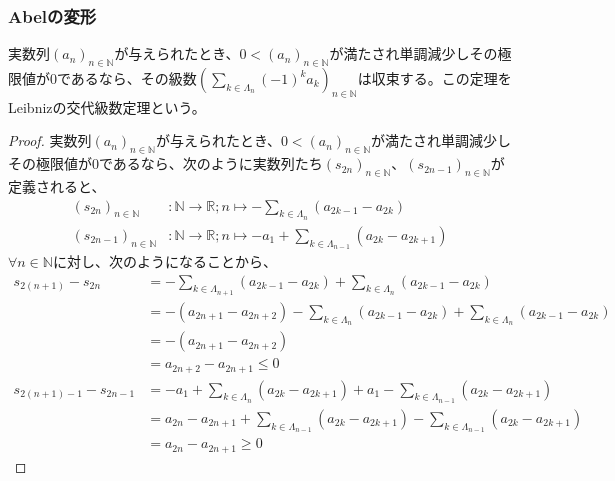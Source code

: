 \documentclass[dvipdfmx]{jsarticle}
\begin{document}
\subsubsection{Abelの変形}%
\begin{thm}[Leibnizの交代級数定理]\label{4.1.8.25}
実数列$\left( a_{n} \right)_{n \in \mathbb{N}}$が与えられたとき、$0 < \left( a_{n} \right)_{n \in \mathbb{N}}$が満たされ単調減少しその極限値が$0$であるなら、その級数$\left( \sum_{k \in \varLambda_{n}} {( - 1)^{k}a_{k}} \right)_{n \in \mathbb{N}}$は収束する。この定理をLeibnizの交代級数定理という。
\end{thm}
\begin{proof}
実数列$\left( a_{n} \right)_{n \in \mathbb{N}}$が与えられたとき、$0 < \left( a_{n} \right)_{n \in \mathbb{N}}$が満たされ単調減少しその極限値が$0$であるなら、次のように実数列たち$\left( s_{2n} \right)_{n \in \mathbb{N}}$、$\left( s_{2n - 1} \right)_{n \in \mathbb{N}}$が定義されると、
\begin{align*}
\left( s_{2n} \right)_{n \in \mathbb{N}}&:\mathbb{N} \rightarrow \mathbb{R};n \mapsto - \sum_{k \in \varLambda_{n}} \left( a_{2k - 1} - a_{2k} \right)\\
\left( s_{2n - 1} \right)_{n \in \mathbb{N}}&:\mathbb{N} \rightarrow \mathbb{R};n \mapsto - a_{1} + \sum_{k \in \varLambda_{n - 1}} \left( a_{2k} - a_{2k + 1} \right)
\end{align*}
$\forall n \in \mathbb{N}$に対し、次のようになることから、
\begin{align*}
s_{2(n + 1)} - s_{2n} &= - \sum_{k \in \varLambda_{n + 1}} \left( a_{2k - 1} - a_{2k} \right) + \sum_{k \in \varLambda_{n}} \left( a_{2k - 1} - a_{2k} \right)\\
&= - \left( a_{2n + 1} - a_{2n + 2} \right) - \sum_{k \in \varLambda_{n}} \left( a_{2k - 1} - a_{2k} \right) + \sum_{k \in \varLambda_{n}} \left( a_{2k - 1} - a_{2k} \right)\\
&= - \left( a_{2n + 1} - a_{2n + 2} \right)\\
&= a_{2n + 2} - a_{2n + 1} \leq 0\\
s_{2(n + 1) - 1} - s_{2n - 1} &= - a_{1} + \sum_{k \in \varLambda_{n}} \left( a_{2k} - a_{2k + 1} \right) + a_{1} - \sum_{k \in \varLambda_{n - 1}} \left( a_{2k} - a_{2k + 1} \right)\\
&= a_{2n} - a_{2n + 1} + \sum_{k \in \varLambda_{n - 1}} \left( a_{2k} - a_{2k + 1} \right) - \sum_{k \in \varLambda_{n - 1}} \left( a_{2k} - a_{2k + 1} \right)\\
&= a_{2n} - a_{2n + 1} \geq 0

\end{align*}
\end{proof}
\end{document}
